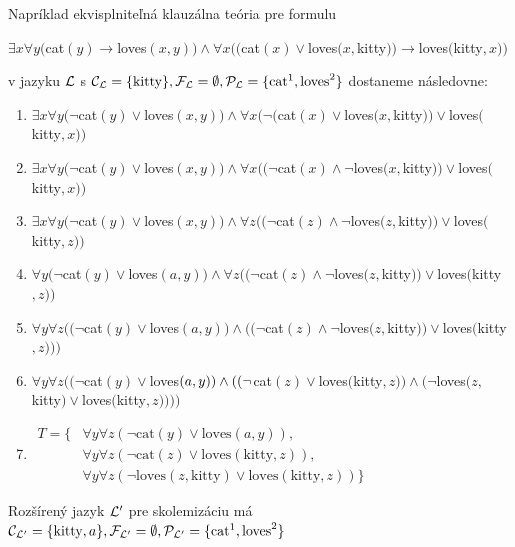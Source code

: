 Napríklad ekvisplniteľná klauzálna teória pre formulu 
\begin{center}
$\exists x \forall y ($cat$(y) \to $loves$(x, y)) \land \forall x (($cat$(x) \lor $loves$(x, $kitty$)) \to $loves$($kitty$, x))$ 
\end{center}
v jazyku $\mathcal{L}$ s $\mathcal{C}_{\mathcal{L}} = \{\text{kitty}\}, \mathcal{F}_{\mathcal{L}} = \emptyset, \mathcal{P}_{\mathcal{L}} = \{\text{cat}^1, \text{loves}^2\}$ dostaneme následovne:
\begin{enumerate}
\item $\exists x \forall y (\neg$cat$(y) \lor $loves$(x, y)) \land \forall x (\neg($cat$(x) \lor $loves$(x, $kitty$)) \lor $loves$($kitty$, x))$ 
\item $\exists x \forall y (\neg$cat$(y) \lor $loves$(x, y)) \land \forall x ((\neg$cat$(x) \land \neg$loves$(x, $kitty$)) \lor $loves$($kitty$, x))$ 
\item $\exists x \forall y (\neg$cat$(y) \lor $loves$(x, y)) \land \forall z ((\neg$cat$(z) \land \neg$loves$(z, $kitty$)) \lor $loves$($kitty$, z))$ 
\item $\forall y (\neg$cat$(y) \lor $loves$(a, y)) \land \forall z ((\neg$cat$(z) \land \neg$loves$(z, $kitty$)) \lor $loves$($kitty$, z))$ 
\item $\forall y \forall z ((\neg$cat$(y) \lor $loves$(a, y)) \land ((\neg$cat$(z) \land \neg$loves$(z, $kitty$)) \lor $loves$($kitty$, z)))$ 
\item $\forall y \forall z ((\neg$cat$(y) \lor $loves$(a, y)) \land \\ 
((\neg$cat$(z) \lor $loves$($kitty$, z)) \land (\neg$loves$(z, $kitty$) \lor $loves$($kitty$, z))))$ 
\item $ \begin{aligned}
	T = \{ &\forall y \forall z (\neg\text{cat}(y) \lor \text{loves}(a, y)), \\
&\forall y \forall z (\neg\text{cat}(z) \lor \text{loves}(\text{kitty}, z)), \\
&\forall y \forall z (\neg\text{loves}(z, \text{kitty}) \lor \text{loves}(\text{kitty}, z))\}
	\end{aligned}
$
\end{enumerate}
Rozšírený jazyk $\mathcal{L}'$ pre skolemizáciu má $\mathcal{C}_{\mathcal{L} '} = \{\text{kitty}, a\}, \mathcal{F}_{\mathcal{L} '} = \emptyset, \mathcal{P}_{\mathcal{L} '} = \{\text{cat}^1, \text{loves}^2\}$











